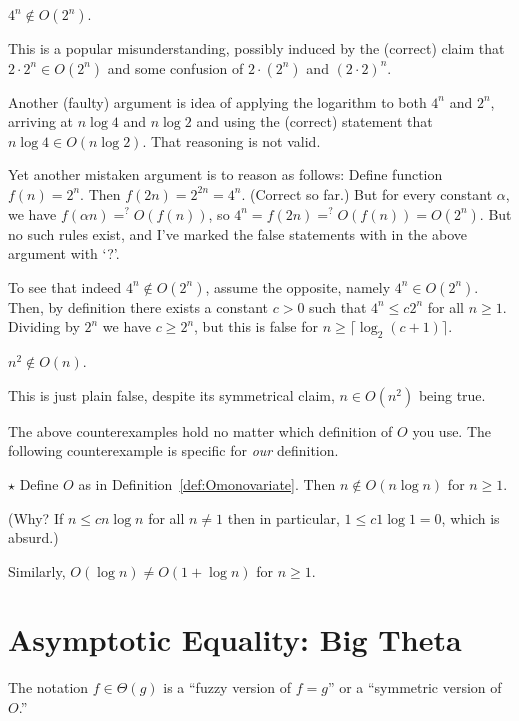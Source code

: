 \documentclass{tstextbook}
\begin{document}
\begin{example}
  $4^n \notin O(2^n)$.

  This is a popular misunderstanding, possibly induced by the (correct) claim that $2\cdot 2^n\in O(2^n)$ and some confusion of $2\cdot (2^n)$ and ${(2\cdot 2)}^n$.

  Another (faulty) argument is idea of applying the logarithm to both $4^n$ and $2^n$, arriving at $n\log 4$ and $n\log 2$ and using the (correct) statement that $n\log 4\in O(n\log 2)$.
  That reasoning is not valid.
  
  Yet another mistaken argument is to reason as follows:
  Define function $f(n)=2^n$.
  Then $f(2n) = 2^{2n} = 4^n$. (Correct so far.)
  But for every constant $\alpha$, we have $f(\alpha n) =^?  O(f(n))$, so $4^n = f(2n) =^? O(f(n))=O(2^n)$.
  But no such rules exist, and I've marked the false statements with in the above argument with `?'.

\medskip
  To see that indeed $4^n\notin O(2^n)$, assume the opposite, namely $4^n\in O(2^n)$.
  Then, by definition there exists a constant $c>0$ such that $4^n\leq c2^n$ for all $n\geq 1$.
  Dividing by $2^n$ we have $c \geq 2^n$, but this is false for $n \geq \lceil\log_2 (c+1)\rceil$.
\end{example}

\begin{example}
  $n^2 \notin O(n)$.

  This is just plain false, despite its symmetrical claim, $n\in O(n^2)$ being true.
\end{example}


The above counterexamples hold no matter which definition of $O$ you use.
The following counterexample is specific for \emph{our} definition.

\begin{example} $\star$
  Define $O$ as in Definition~\ref{def:Omonovariate}.
  Then $n\notin O(n\log n)$ for $n\geq 1$.
  
  (Why? If $n\leq c n\log n$ for all $n \neq 1$ then in particular, $1\leq c 1\log 1 = 0$, which is absurd.)

	
  Similarly, $O(\log n) \neq O(1 + \log n)$ for $n\geq 1$.
\end{example}

\section{Asymptotic Equality: Big Theta}

The notation \(f\in \Theta(g) \) is a “fuzzy version of \(f=  g\)” or a “symmetric version of $O$.”
\end{document}
